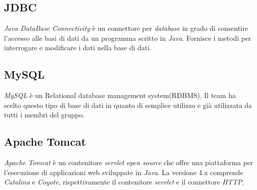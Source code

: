 \subsection{JDBC}
\textit{Java DataBase Connectivity} è un connettore per \textit{database} in grado di consentire l'accesso alle basi di dati da un programma scritto in \textit{Java}. Fornisce i metodi per interrogare e modificare i dati nella base di dati.
\subsection{MySQL}
\textit{MySQL} è un Relational database management system(RDBMS). Il team ha scelto questo tipo di base di dati in quanto di semplice utilizzo e già utilizzata da tutti i membri del gruppo.
\subsection{Apache Tomcat}
\textit{Apache Tomcat} è un contenitore \textit{servlet} \textit{open source} che offre una piattaforma per l'esecuzione di applicazioni web sviluppate in \textit{Java}. La versione 4.x comprende \textit{Catalina} e \textit{Coyote}, rispettivamente il contenitore \textit{servlet} e il connettore \textit{HTTP}.